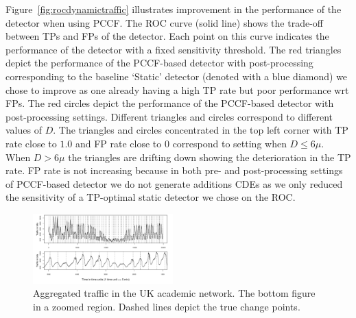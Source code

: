 Figure~\ref{fig:rocdynamictraffic} illustrates improvement in the performance of the detector when using PCCF.
The ROC curve (solid line) shows the trade-off between TPs and FPs of the detector. %
Each point on this curve indicates the performance of the detector with a fixed sensitivity threshold.
The red triangles depict the performance of the PCCF-based detector with post-processing corresponding to the baseline `Static' detector (denoted with a blue diamond) we chose to improve as one already having a high TP rate but poor performance wrt FPs.
The red circles depict the performance of the PCCF-based detector with post-processing settings.
Different triangles and circles correspond to different values of $D$.
The triangles and circles concentrated in the top left corner with TP rate close to $1.0$ and FP rate close to $0$ correspond to setting when $D\leq6\mu$.
When $D>6\mu$ the triangles are drifting down showing the deterioration in the TP rate.
FP rate is not increasing because in both pre- and post-processing settings of PCCF-based detector we do not generate additions CDEs as we only reduced the sensitivity of a TP-optimal static detector we chose on the ROC.
\begin{figure}[htb!]
\centering
\includegraphics[width=0.48\textwidth]{articles/pics/sdm_paper/TrafficData.pdf}
\caption{
Aggregated traffic in the UK academic network.
The bottom figure in a zoomed region.
Dashed lines depict the true change points. %
}
\label{fig:trafficdata}
\end{figure}
%

